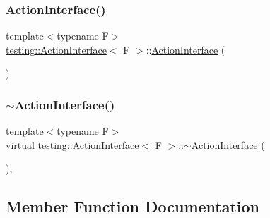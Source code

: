 \subsubsection{\texorpdfstring{ActionInterface()}{ActionInterface()}}
{\footnotesize\ttfamily template$<$typename F$>$ \\
\mbox{\hyperlink{classtesting_1_1ActionInterface}{testing\+::\+Action\+Interface}}$<$ F $>$\+::\mbox{\hyperlink{classtesting_1_1ActionInterface}{Action\+Interface}} (\begin{DoxyParamCaption}{ }\end{DoxyParamCaption})\hspace{0.3cm}{\ttfamily [inline]}}

\mbox{\label{classtesting_1_1ActionInterface_a7dd0a5fc93d86ae3c9d04963b9f3a93f}} 
\subsubsection{\texorpdfstring{$\sim$ActionInterface()}{~ActionInterface()}}
{\footnotesize\ttfamily template$<$typename F$>$ \\
virtual \mbox{\hyperlink{classtesting_1_1ActionInterface}{testing\+::\+Action\+Interface}}$<$ F $>$\+::$\sim$\mbox{\hyperlink{classtesting_1_1ActionInterface}{Action\+Interface}} (\begin{DoxyParamCaption}{ }\end{DoxyParamCaption})\hspace{0.3cm}{\ttfamily [inline]}, {\ttfamily [virtual]}}



\subsection{Member Function Documentation}
\mbox{\label{classtesting_1_1ActionInterface_a20f8624fcea1786f2992b358760422a0}} 
